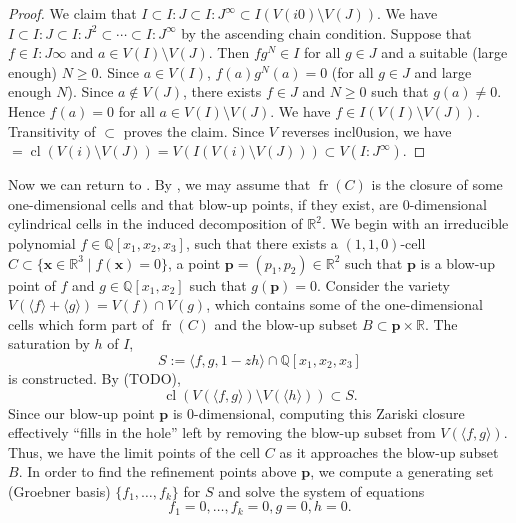 \documentclass[
]{book}
\theoremstyle{definition}
\theoremstyle{definition}
\theoremstyle{definition}
\theoremstyle{definition}
\theoremstyle{remark}
\begin{document}
\begin{proof}
We claim that \(I \subset I:J \subset I:J^\infty \subset I(V(i0) \setminus V(J))\). We have \(I \subset I:J \subset I:J^2 \subset \cdots \subset I:J^\infty\) by the ascending chain condition.
Suppose that \(f \in I:J\infty\) and \(a \in V(I) \setminus V(J)\). Then \(fg^N \in I\) for all \(g \in J\) and a suitable (large enough) \(N\ge 0\). Since \(a \in V(I)\), \(f(a)g^N(a) = 0\) (for all \(g\in J\) and large enough \(N\)). Since \(a \not \in V(J)\), there exists \(f \in J\) and \(N \ge 0\) such that \(g(a) \ne 0\). Hence \(f(a) = 0\) for all \(a \in V(I) \setminus V(J)\). We have \(f \in I(V(I) \setminus V(J))\). Transitivity of \(\subset\) proves the claim. Since \(V\) reverses incl0usion, we have \(= {\operatorname{cl} \left(  V(i) \setminus V(J)  \right)} = V(I(V(i) \setminus V(J))) \subset V(I:J^\infty)\).
\end{proof}

Now we can return to \citep[Proposition 5.14]{lazard10}. By \citep[Proposition 5.13]{lazard10}, we may assume that \({\operatorname{fr} \left(  C  \right)}\) is the closure of some one-dimensional cells and that blow-up points, if they exist, are 0-dimensional cylindrical cells in the induced decomposition of \(\mathbb{R}^2\).
We begin with an irreducible polynomial \(f \in \mathbb{Q}[x_1,x_2,x_3]\), such that there exists a \((1,1,0)\)-cell \(C \subset \{ \mathbf{x} \in \mathbb{R}^3 \mid f(\mathbf{x}) = 0 \}\), a point \(\mathbf{p} = (p_1,p_2) \in \mathbb{R}^2\) such that \(\mathbf{p}\) is a blow-up point of \(f\) and \(g \in \mathbb{Q}[x_1,x_2]\) such that \(g(\mathbf{p}) = 0\).
Consider the variety \(V(\langle f \rangle + \langle g \rangle ) = V(f) \cap V(g)\), which contains some of the one-dimensional cells which form part of \({\operatorname{fr} \left( C \right)}\) and the blow-up subset \(B \subset \mathbf{p} \times \mathbb{R}\).
The saturation by \(h\) of \(I\),
\[
S := \langle f, g, 1 - zh \rangle \cap \mathbb{Q}[x_1,x_2,x_3]
\]
is constructed.
By \citep[Theorem 10]{cox2013} (TODO),
\[
{\operatorname{cl} \left(  V(\langle f,g \rangle) \setminus V(\langle h \rangle)  \right)} \subset S.
\]
Since our blow-up point \(\mathbf{p}\) is \(0\)-dimensional, computing this Zariski closure effectively ``fills in the hole'' left by removing the blow-up subset from \(V(\langle f,g \rangle)\). Thus, we have the limit points of the cell \(C\) as it approaches the blow-up subset \(B\).
In order to find the refinement points above \(\mathbf{p}\), we compute a generating set (Groebner basis) \(\{ f_1,\ldots,f_k \}\) for \(S\) and solve the system of equations
\[
f_1 = 0, \ldots, f_k = 0, g = 0, h = 0.
\]
\end{document}
